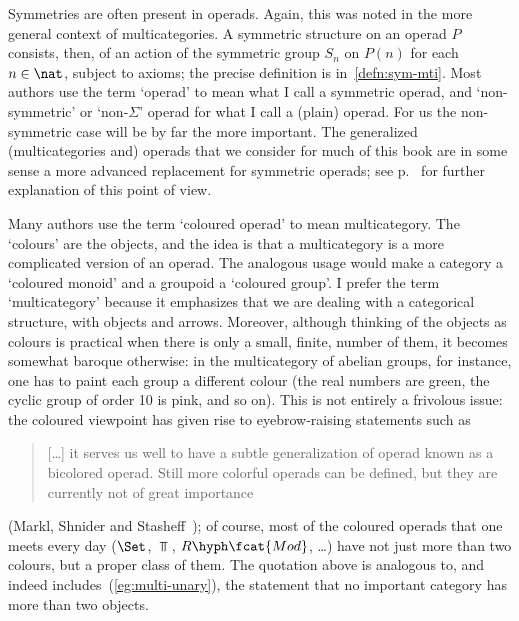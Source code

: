 Symmetries%
%
%
are often present in operads.  Again, this was noted in the more
general context of multicategories.  A symmetric structure on an operad $P$
consists, then, of an action of the symmetric group $S_n$ on $P(n)$ for
each $n\in\nat$, subject to axioms; the precise definition is
in~\ref{defn:sym-mti}.  Most authors use the term `operad' to mean what I
call a symmetric operad, and `non-symmetric' or `non-$\Sigma$' operad for
what I call a (plain) operad.  For us the non-symmetric case will be by far
the more important.  The generalized (multicategories and) operads that we
consider for much of this book are in some sense a more advanced
replacement for symmetric operads; see p.~\pageref{p:sym-discussion} for
further explanation of this point of view.

Many authors use the term `coloured%
%
%
operad' to mean multicategory.  The `colours' are the objects, and the idea
is that a multicategory is a more complicated version of an operad.  The
analogous usage would make a category a `coloured monoid' and a groupoid a
`coloured group'.  I prefer the term `multicategory' because it emphasizes
that we are dealing with a categorical structure, with objects and arrows.
Moreover, although thinking of the objects as colours is practical when
there is only a small, finite, number of them, it becomes somewhat baroque
otherwise: in the multicategory of abelian groups, for instance, one has to
paint each group a different colour (the real numbers are green, the cyclic
group of order 10 is pink, and so on).  This is not entirely a frivolous
issue: the coloured viewpoint has given rise to eyebrow-raising statements
such as
%
\begin{quote}	
  [\ldots] it serves us well to have a subtle generalization of operad
  known as a bicolored operad.  Still more colorful operads can be defined,
  but they are currently not of great importance
\end{quote}
%
(Markl,%
%
%
Shnider%
%
%
and Stasheff~\cite[p.~115]{MSS});%
%
%
of course, most of the
coloured operads that one meets every day 
($\Set$, $\Top$, $R\hyph\fcat{Mod}$, \ldots)
have not just more than two colours, but a proper class of them.  The
quotation above is analogous to, and indeed
includes~(\ref{eg:multi-unary}), the statement that no important category
has more than two objects.%
%
%

